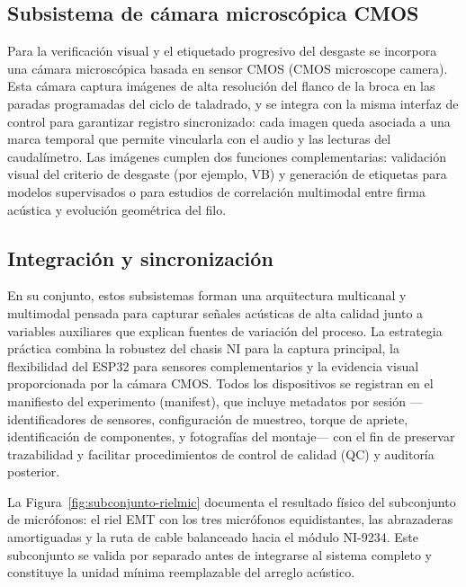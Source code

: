 \documentclass[12pt, letterpaper]{report}
\begin{document}
\subsection{Subsistema de cámara microscópica CMOS}

Para la verificación visual y el etiquetado progresivo del desgaste se incorpora una cámara microscópica basada en sensor CMOS (CMOS microscope camera). Esta cámara captura imágenes de alta resolución del flanco de la broca en las paradas programadas del ciclo de taladrado, y se integra con la misma interfaz de control para garantizar registro sincronizado: cada imagen queda asociada a una marca temporal que permite vincularla con el audio y las lecturas del caudalímetro. Las imágenes cumplen dos funciones complementarias: validación visual del criterio de desgaste (por ejemplo, VB) y generación de etiquetas para modelos supervisados o para estudios de correlación multimodal entre firma acústica y evolución geométrica del filo.

\subsection{Integración y sincronización}

En su conjunto, estos subsistemas forman una arquitectura multicanal y multimodal pensada para capturar señales acústicas de alta calidad junto a variables auxiliares que explican fuentes de variación del proceso. La estrategia práctica combina la robustez del chasis NI para la captura principal, la flexibilidad del ESP32 para sensores complementarios y la evidencia visual proporcionada por la cámara CMOS. Todos los dispositivos se registran en el manifiesto del experimento (manifest), que incluye metadatos por sesión ---identificadores de sensores, configuración de muestreo, torque de apriete, identificación de componentes, y fotografías del montaje--- con el fin de preservar trazabilidad y facilitar procedimientos de control de calidad (QC) y auditoría posterior.

La Figura~\ref{fig:subconjunto-rielmic} documenta el resultado f\'{i}sico del subconjunto de micr\'{o}fonos: el riel EMT con los tres micr\'{o}fonos equidistantes, las abrazaderas amortiguadas y la ruta de cable balanceado hacia el m\'{o}dulo NI-9234. Este subconjunto se valida por separado antes de integrarse al sistema completo y constituye la unidad m\'{i}nima reemplazable del arreglo ac\'{u}stico.
\end{document}
